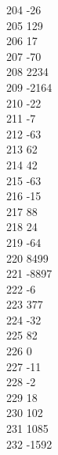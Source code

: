{ 204	-26 \\
 205	129 \\
 206	17 \\
 207	-70 \\
 208	2234 \\
 209	-2164 \\
 210	-22 \\
 211	-7 \\
 212	-63 \\
 213	62 \\
 214	42 \\
 215	-63 \\
 216	-15 \\
 217	88 \\
 218	24 \\
 219	-64 \\
 220	8499 \\
 221	-8897 \\
 222	-6 \\
 223	377 \\
 224	-32 \\
 225	82 \\
 226	0 \\
 227	-11 \\
 228	-2 \\
 229	18 \\
 230	102 \\
 231	1085 \\
 232	-1592 \\
}
